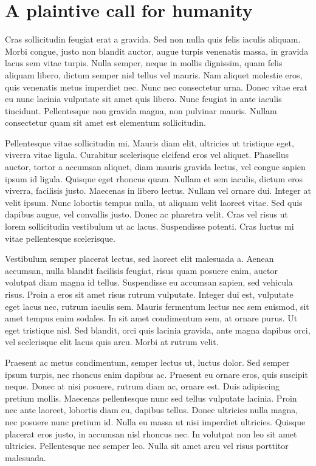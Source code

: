 \documentclass[11pt,a4paper]{memoir}\usepackage[]{graphicx}\usepackage[]{color}
\begin{document}
\section{A plaintive call for humanity}
Cras sollicitudin feugiat erat a gravida. Sed non nulla quis felis iaculis aliquam. Morbi congue, justo non blandit auctor, augue turpis venenatis massa, in gravida lacus sem vitae turpis. Nulla semper, neque in mollis dignissim, quam felis aliquam libero, dictum semper nisl tellus vel mauris. Nam aliquet molestie eros, quis venenatis metus imperdiet nec. Nunc nec consectetur urna. Donec vitae erat eu nunc lacinia vulputate sit amet quis libero. Nunc feugiat in ante iaculis tincidunt. Pellentesque non gravida magna, non pulvinar mauris. Nullam consectetur quam sit amet est elementum sollicitudin.

Pellentesque vitae sollicitudin mi. Mauris diam elit, ultricies ut tristique eget, viverra vitae ligula. Curabitur scelerisque eleifend eros vel aliquet. Phasellus auctor, tortor a accumsan aliquet, diam mauris gravida lectus, vel congue sapien ipsum id ligula. Quisque eget rhoncus quam. Nullam et sem iaculis, dictum eros viverra, facilisis justo. Maecenas in libero lectus. Nullam vel ornare dui. Integer at velit ipsum. Nunc lobortis tempus nulla, ut aliquam velit laoreet vitae. Sed quis dapibus augue, vel convallis justo. Donec ac pharetra velit. Cras vel risus ut lorem sollicitudin vestibulum ut ac lacus. Suspendisse potenti. Cras luctus mi vitae pellentesque scelerisque.

Vestibulum semper placerat lectus, sed laoreet elit malesuada a. Aenean accumsan, nulla blandit facilisis feugiat, risus quam posuere enim, auctor volutpat diam magna id tellus. Suspendisse eu accumsan sapien, sed vehicula risus. Proin a eros sit amet risus rutrum vulputate. Integer dui est, vulputate eget lacus nec, rutrum iaculis sem. Mauris fermentum lectus nec sem euismod, sit amet tempus enim sodales. In sit amet condimentum sem, at ornare purus. Ut eget tristique nisl. Sed blandit, orci quis lacinia gravida, ante magna dapibus orci, vel scelerisque elit lacus quis arcu. Morbi at rutrum velit.

Praesent ac metus condimentum, semper lectus ut, luctus dolor. Sed semper ipsum turpis, nec rhoncus enim dapibus ac. Praesent eu ornare eros, quis suscipit neque. Donec at nisi posuere, rutrum diam ac, ornare est. Duis adipiscing pretium mollis. Maecenas pellentesque nunc sed tellus vulputate lacinia. Proin nec ante laoreet, lobortis diam eu, dapibus tellus. Donec ultricies nulla magna, nec posuere nunc pretium id. Nulla eu massa ut nisi imperdiet ultricies. Quisque placerat eros justo, in accumsan nisl rhoncus nec. In volutpat non leo sit amet ultricies. Pellentesque nec semper leo. Nulla sit amet arcu vel risus porttitor malesuada.
\end{document}
